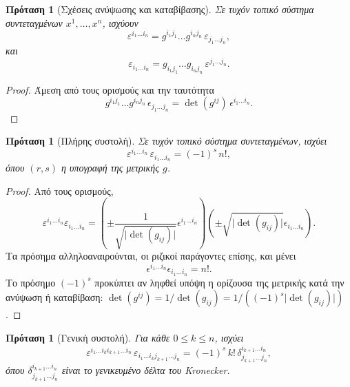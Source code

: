 \documentclass[11pt,a4paper,twoside,openright]{book}
\newtheorem{proposition}[lemma]{Πρόταση}
\begin{document}
\begin{proposition}[Σχέσεις ανύψωσης και καταβίβασης]
	\label{prop:raising-lowering-levi-civita}
Σε τυχόν τοπικό σύστημα συντεταγμένων $x^1, \dots, x^n$, ισχύουν
\begin{equation}
\varepsilon^{i_1 \dots i_n}
=
g^{i_1 j_1} \dots g^{i_n j_n}
\,
\varepsilon_{j_1 \dots j_n},
\end{equation}
και
\begin{equation}
\varepsilon_{i_1 \dots i_n}
=
g_{i_1 j_1} \dots g_{i_n j_n}
\,
\varepsilon^{j_1 \dots j_n}.
\end{equation}
\end{proposition}

\begin{proof}
Άμεση από τους ορισμούς και την ταυτότητα
\begin{equation*}
g^{i_1 j_1} \dots g^{i_n j_n}
\,
\epsilon_{j_1 \dots j_n}
=
\det(g^{ij})
\,
\epsilon^{i_1 \dots i_n}.
\end{equation*}
\end{proof}

\begin{proposition}[Πλήρης συστολή]
	\label{prop:full-contraction-levi-civita}
Σε τυχόν τοπικό σύστημα συντεταγμένων, ισχύει
\begin{equation}
\varepsilon^{i_1 \dots i_n}
\,
\varepsilon_{i_1 \dots i_n}
=
(-1)^s
\,
n!,
\end{equation}
όπου $(r, s)$ η υπογραφή της μετρικής $g$.
\end{proposition}

\begin{proof}
Από τους ορισμούς,
\begin{equation*}
\varepsilon^{i_1 \dots i_n}
\varepsilon_{i_1 \dots i_n}
=
\left(
\pm \frac{1}{\sqrt{\lvert \det(g_{ij}) \rvert}}
\epsilon^{i_1 \dots i_n}
\right)
\left(
\pm \sqrt{\lvert \det(g_{ij}) \rvert}
\epsilon_{i_1 \dots i_n}
\right).
\end{equation*}
Τα πρόσημα αλληλοαναιρούνται, οι ριζικοί παράγοντες επίσης, και μένει
\begin{equation*}
\epsilon^{i_1 \dots i_n}
\epsilon_{i_1 \dots i_n}
=
n!.
\end{equation*}
Το πρόσημο $(-1)^s$ προκύπτει αν ληφθεί υπόψη η ορίζουσα της μετρικής κατά την ανύψωση ή καταβίβαση: $\det(g^{ij}) = 1/\det(g_{ij}) = 1/((-1)^s \lvert \det(g_{ij}) \rvert)$.
\end{proof}

\begin{proposition}[Γενική συστολή]
	\label{prop:general-contraction-levi-civita}
Για κάθε $0 \le k \le n$, ισχύει
\begin{equation}
\varepsilon^{i_1 \dots i_k i_{k+1} \dots i_n}
\,
\varepsilon_{i_1 \dots i_k j_{k+1} \dots j_n}
=
(-1)^s
\,
k!
\,
\delta^{i_{k+1} \dots i_n}_{j_{k+1} \dots j_n},
\end{equation}
όπου $\delta^{i_{k+1} \dots i_n}_{j_{k+1} \dots j_n}$ είναι το γενικευμένο δέλτα του Kronecker.
\end{proposition}
\end{document}

